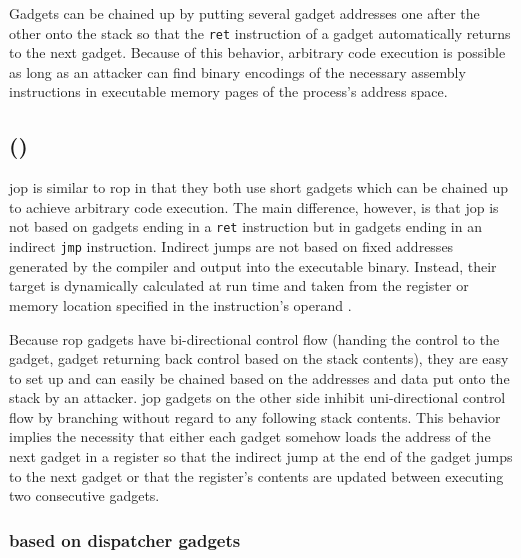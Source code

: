 Gadgets can be chained up by putting several gadget addresses one after the other onto the stack so that the \texttt{ret} instruction of a gadget automatically returns to the next gadget.
Because of this behavior, arbitrary code execution is possible as long as an attacker can find binary encodings of the necessary assembly instructions in executable memory pages of the process's address space.

\subsection{ ()}
\label{subsec:cr-jop}

\gls{jop} is similar to \gls{rop} in that they both use short gadgets which can be chained up to achieve arbitrary code execution.
The main difference, however, is that \gls{jop} is not based on gadgets ending in a \texttt{ret} instruction but in gadgets ending in an indirect \texttt{jmp} instruction.
Indirect jumps are not based on fixed addresses generated by the compiler and output into the executable binary.
Instead, their target is dynamically calculated at run time and taken from the register or memory location specified in the instruction's operand \cite[3-517\psqq]{IntelCorporation2020}.

Because \gls{rop} gadgets have bi-directional control flow (handing the control to the gadget, gadget returning back control based on the stack contents), they are easy to set up and can easily be chained based on the addresses and data put onto the stack by an attacker.
\gls{jop} gadgets on the other side inhibit uni-directional control flow by branching without regard to any following stack contents.
This behavior implies the necessity that either each gadget somehow loads the address of the next gadget in a register so that the indirect jump at the end of the gadget jumps to the next gadget or that the register's contents are updated between executing two consecutive gadgets.


\subsubsection{ based on dispatcher gadgets}
\label{subsubsec:cr-jop-dispatcher}

